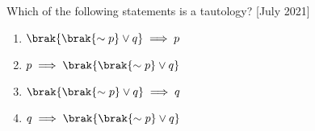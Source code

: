     \item Which of the following statements is a tautology?
    \hfill{[July 2021]}
    \begin{enumerate}
        \item $\brak{\brak{\sim p} \lor q} \implies p$
        \item $p \implies \brak{\brak{\sim p} \lor q}$
        \item $\brak{\brak{\sim p} \lor q} \implies q$
        \item $q \implies \brak{\brak{\sim p} \lor q}$
    \end{enumerate}
